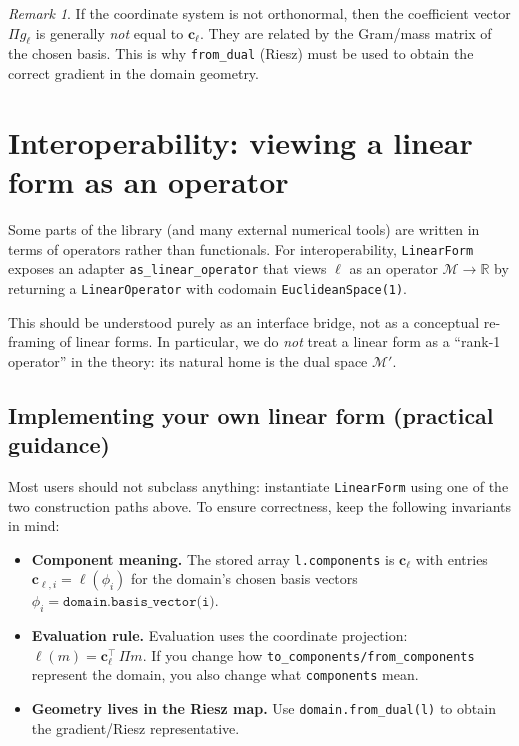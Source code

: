 \documentclass[11pt,twoside,openright]{book}
\theoremstyle{plain}
\theoremstyle{definition}
\theoremstyle{remark}
\newtheorem*{remark}{Remark}
\newcommand{\modelspace}{\mathcal{M}}
\begin{document}
\begin{remark}
If the coordinate system is not orthonormal, then the coefficient vector
$\Pi g_\ell$ is generally \emph{not} equal to $\mathbf{c}_\ell$.
They are related by the Gram/mass matrix of the chosen basis.
This is why \texttt{from\_dual} (Riesz) must be used to obtain the correct
gradient in the domain geometry.
\end{remark}

\section{Interoperability: viewing a linear form as an operator}
\label{sec:form-as-operator}

Some parts of the library (and many external numerical tools) are written in
terms of operators rather than functionals.
For interoperability, \texttt{LinearForm} exposes an adapter
\texttt{as\_linear\_operator} that views $\ell$ as an operator
$\modelspace\to\mathbb{R}$ by returning a \texttt{LinearOperator} with codomain
\texttt{EuclideanSpace(1)}.

This should be understood purely as an interface bridge, not as a conceptual
re-framing of linear forms.
In particular, we do \emph{not} treat a linear form as a ``rank-1 operator'' in
the theory: its natural home is the dual space $\modelspace'$.

\subsection*{Implementing your own linear form (practical guidance)}

Most users should not subclass anything: instantiate \texttt{LinearForm} using
one of the two construction paths above.
To ensure correctness, keep the following invariants in mind:
\begin{itemize}
  \item \textbf{Component meaning.} The stored array \texttt{l.components} is
    $\mathbf{c}_\ell$ with entries $\mathbf{c}_{\ell,i}=\ell(\phi_i)$ for the
    domain's chosen basis vectors $\phi_i=\texttt{domain.basis\_vector(i)}$.
  \item \textbf{Evaluation rule.} Evaluation uses the coordinate projection:
    $\ell(m)=\mathbf{c}_\ell^\top\,\Pi m$.
    If you change how \texttt{to\_components/from\_components} represent the
    domain, you also change what \texttt{components} mean.
  \item \textbf{Geometry lives in the Riesz map.} Use
    \texttt{domain.from\_dual(l)} to obtain the gradient/Riesz representative.
\end{itemize}
\end{document}
